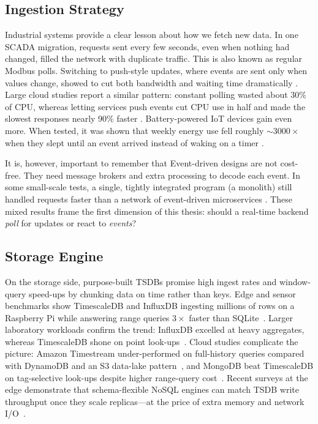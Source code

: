 \documentclass[nomenclature, english, biblatex]{kththesis}
\numberwithin{listing}{chapter}
\begin{document}
\subsection{Ingestion Strategy}
Industrial systems provide a clear lesson about how we fetch new data. In one SCADA migration, requests sent every few seconds, even when nothing had changed, filled the network with duplicate traffic. This is also known as regular Modbus polls. Switching to push-style updates, where events are sent only when values change, showed to cut both bandwidth and waiting time dramatically \cite{Johansson2021SCADAIaaS}.  
Large cloud studies report a similar pattern: constant polling wasted about 30\% of CPU, whereas letting services push events cut CPU use in half and made the slowest responses nearly 90\% faster \cite{Lewis2020PowerOfEDA}.  
Battery-powered IoT devices gain even more. When tested, it was shown that weekly energy use fell roughly \( \sim3000\times \) when they slept until an event arrived instead of waking on a timer \cite{Makarovi2022EnergyEfficientIoT}.  

It is, however, important to remember that Event-driven designs are not cost-free. They need message brokers and extra processing to decode each event. In some small-scale tests, a single, tightly integrated program (a monolith) still handled requests faster than a network of event-driven microservices \cite{Trindade2021EDAImpact}.  
These mixed results frame the first dimension of this thesis: should a real-time backend \emph{poll} for updates or react to \emph{events}?

\subsection{Storage Engine}
On the storage side, purpose-built TSDBs promise high ingest rates and window-query speed-ups by chunking data on time rather than keys.  
Edge and sensor benchmarks show TimescaleDB and InfluxDB ingesting millions of rows on a Raspberry Pi while answering range queries \(3{\times}\) faster than SQLite~\cite{Grzesik2020EdgeIoTBenchmark}.  
Larger laboratory workloads confirm the trend: InfluxDB excelled at heavy aggregates, whereas TimescaleDB shone on point look-ups~\cite{Daqouri2023TimeseriesVsSQL,Heldt2021SciTS}.  
Cloud studies complicate the picture: Amazon Timestream under-performed on full-history queries compared with DynamoDB and an S3 data-lake pattern~\cite{Johansson2022AWSCloudData}, and MongoDB beat TimescaleDB on tag-selective look-ups despite higher range-query cost~\cite{Mohamed2024DBMSComparison}.  
Recent surveys at the edge demonstrate that schema-flexible NoSQL engines can match TSDB write throughput once they scale replicas—at the price of extra memory and network I/O~\cite{Zhang2023EdgeTSDB,Vergara2021PerformanceTSDB}.
\end{document}
